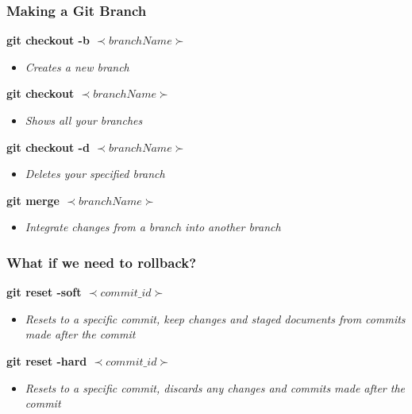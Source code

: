 \documentclass{beamer}
\begin{document}
\begin{frame}
	\frametitle{\textbf{Making a Git Branch}}
		

	\textbf{git checkout -b \(\prec branchName \succ\)}
	\begin{itemize}
		\item \textit{Creates a new branch}
	\end{itemize}
	\vspace{0.25cm}

	\textbf{git checkout \(\prec branchName \succ\)}
	\begin{itemize}
		\item \textit{Shows all your branches}
	\end{itemize}
	\vspace{0.25cm}

	\textbf{git checkout -d \(\prec branchName \succ\)}
	\begin{itemize}
		\item \textit{Deletes your specified branch}
	\end{itemize}
	\vspace{0.25cm}

	\textbf{git merge \(\prec branchName \succ\)}
	\begin{itemize}
		\item \textit{Integrate changes from a branch into another branch}
	\end{itemize}
	
\end{frame}

\begin{frame}
	\frametitle{\textbf{What if we need to rollback?}}
	
	\textbf{git reset -soft \(\prec commit\_id \succ\)}
	\begin{itemize}
		\item \textit{Resets to a specific commit, keep changes and staged documents from commits made after the commit}
	\end{itemize}
	\vspace{0.25cm}

	\textbf{git reset -hard \(\prec commit\_id \succ\)}
	\begin{itemize}
		\item \textit{Resets to a specific commit, discards any changes and commits made after the commit}
	\end{itemize}

\end{frame}
\end{document}
